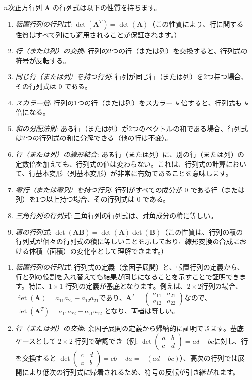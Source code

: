 \begin{thm}[行列式の性質] \label{determinant_property}
$n$次正方行列 $\bm{A}$ の行列式は以下の性質を持ちます。
\begin{enumerate}
    \item \emph{転置行列の行列式}: $\det(\bm{A}^T) = \det(\bm{A})$（この性質により、行に関する性質はすべて列にも適用されることが保証されます。）
    \item \emph{行（または列）の交換}: 行列の2つの行（または列）を交換すると、行列式の符号が反転する。
    \item \emph{同じ行（または列）を持つ行列}: 行列が同じ行（または列）を2つ持つ場合、その行列式は $0$ である。
    \item \emph{スカラー倍}: 行列の1つの行（または列）をスカラー $k$ 倍すると、行列式も $k$ 倍になる。
    \item \emph{和の分配法則}: ある行（または列）が2つのベクトルの和である場合、行列式は2つの行列式の和に分解できる（他の行は不変）。
    \item \emph{行（または列）の線形結合}: ある行（または列）に、別の行（または列）の定数倍を加えても、行列式の値は変わらない。これは、行列式の計算において、行基本変形（列基本変形）が非常に有効であることを意味します。
    \item \emph{零行（または零列）を持つ行列}: 行列がすべての成分が $0$ である行（または列）を1つ以上持つ場合、その行列式は $0$ である。
    \item \emph{三角行列の行列式}: 三角行列の行列式は、対角成分の積に等しい。
    \item \emph{積の行列式}: $\det(\bm{A}\bm{B}) = \det(\bm{A})\det(\bm{B})$（この性質は、行列の積の行列式が個々の行列式の積に等しいことを示しており、線形変換の合成における体積（面積）の変化率として理解できます。）
\end{enumerate}
\begin{proof*}
\begin{enumerate}
    \item \emph{転置行列の行列式}: 行列式の定義（余因子展開）と、転置行列の定義から、行と列の役割を入れ替えても結果が同じになることを示すことで証明できます。特に、$1 \times 1$ 行列の定義が基底となります。例えば、$2 \times 2$行列の場合、$\det(\bm{A})=a_{11}a_{22}-a_{12}a_{21}$であり、$\bm{A}^T=\begin{pmatrix}a_{11} & a_{21} \\ a_{12} & a_{22}\end{pmatrix}$なので、$\det(\bm{A}^T)=a_{11}a_{22}-a_{21}a_{12}$ となり、両者は等しい。
    \item \emph{行（または列）の交換}: 余因子展開の定義から帰納的に証明できます。基底ケースとして $2 \times 2$ 行列で確認でき（例: $\det\begin{pmatrix} a & b \\ c & d \end{pmatrix} = ad-bc$に対し、行を交換すると $\det\begin{pmatrix} c & d \\ a & b \end{pmatrix} = cb-da = -(ad-bc)$）、高次の行列では展開により低次の行列式に帰着されるため、符号の反転が引き継がれます。

\end{enumerate}
\end{proof*}
\end{thm}
